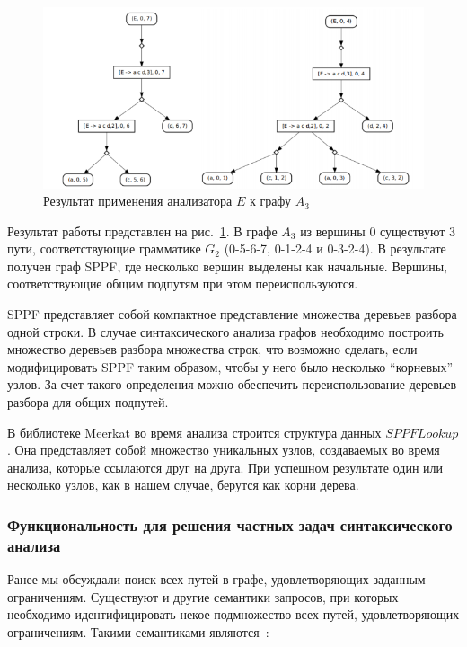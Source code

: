 \begin{figure}
 \centering
 \includegraphics[width=\textwidth]{Smolina/pics/Trees2.png}
 \caption{Результат применения анализатора $E$ к графу $A_3$}
 \label{Trees2}
\end{figure}

Результат работы представлен на рис.~\ref{Trees2}. В графе $A_3$ из вершины 0 существуют 3 пути, соответствующие грамматике $G_2$ (0-5-6-7, 0-1-2-4 и 0-3-2-4). В результате получен граф SPPF, где несколько вершин выделены как начальные. Вершины, соответствующие общим подпутям при этом переиспользуются.

SPPF представляет собой компактное представление множества деревьев разбора одной строки. В случае синтаксического анализа графов необходимо построить множество деревьев разбора множества строк, что возможно сделать, если модифицировать SPPF таким образом, чтобы у него было несколько ``корневых'' узлов. За счет такого определения можно обеспечить переиспользование деревьев разбора для общих подпутей.

В библиотеке Meerkat во время анализа строится структура данных $SPPFLookup$. Она представляет собой множество уникальных узлов, создаваемых во время анализа, которые ссылаются друг на друга. При успешном результате один или несколько узлов, как в нашем случае, берутся как корни дерева.

\subsubsection{Функциональность для решения частных задач синтаксического анализа}

Ранее мы обсуждали поиск всех путей в графе, удовлетворяющих заданным ограничениям. Существуют и другие семантики запросов, при которых необходимо идентифицировать некое подмножество всех путей, удовлетворяющих ограничениям. Такими семантиками являются~\cite{Hellings130}:

